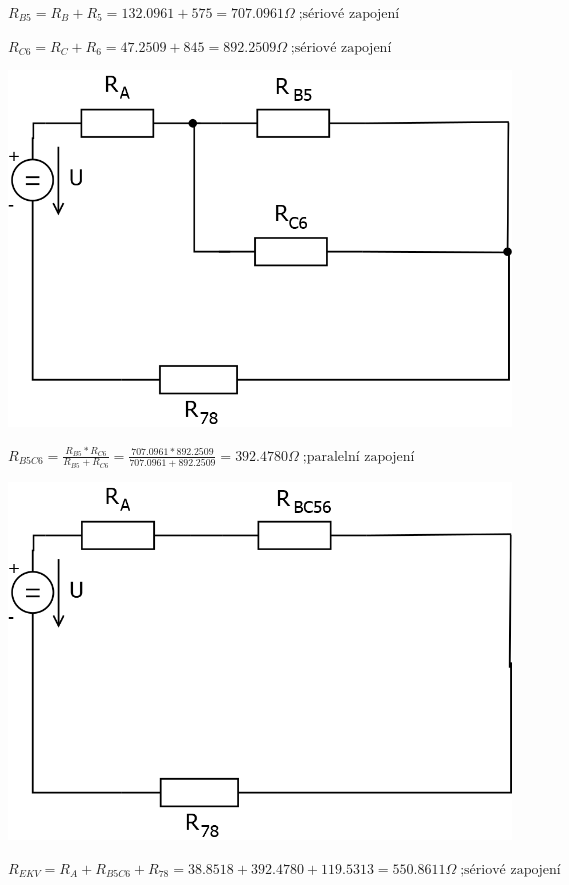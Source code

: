 \documentclass{article}
\begin{document}
\begin{large}
    $R_{B5}=R_B+R_5=132.0961+575=707.0961\Omega\;\text{;sériové zapojení}$
    
    $R_{C6}=R_C+R_6=47.2509+845=892.2509\Omega\;\text{;sériové zapojení}$


\begin{center}
    \includegraphics[scale=0.3]{Pr1/Pr1_4.png}
\end{center}


    $R_{B5C6}=\frac{R_{B5}*R_{C6}}{R_{B5}+R_{C6}}=\frac{707.0961*892.2509}{707.0961+892.2509}=392.4780\Omega\;\text{;paralelní zapojení}$


\begin{center}
    \includegraphics[scale=0.3]{Pr1/Pr1_5.png}
\end{center}


    $R_{EKV}=R_A+R_{B5C6}+R_{78}=38.8518+392.4780+119.5313=550.8611\Omega\;\text{;sériové zapojení}$



\end{large}
\end{document}
